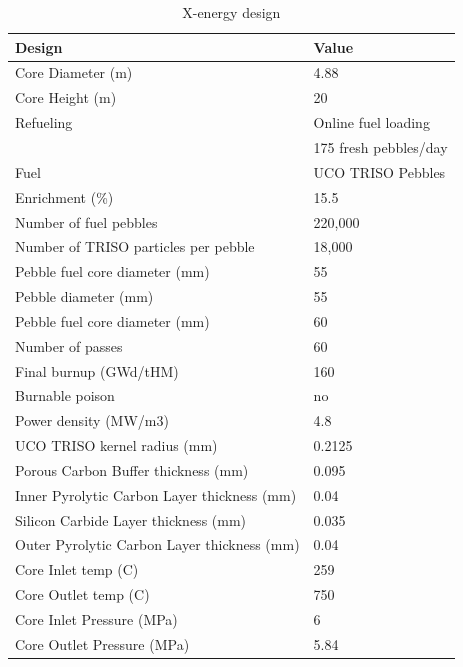 \documentclass[10pt,a4paper]{article}
\begin{document}
\begin{table} [ht]
\begin{center}

\caption{ X-energy design}
\label{xtable}
\begin{tabular}{l l}
\hline 
Design 		&Value \\ 
\hline 
Core Diameter (m) 		&4.88 \\ 
Core Height (m) 		&20 \\ 
Refueling		&Online fuel loading  \\ 
	&175 fresh pebbles/day \\ 
Fuel		&UCO TRISO Pebbles \\ 
Enrichment (\%)		&15.5 \\ 
Number of fuel pebbles		&220,000 \\ 
Number of TRISO particles per pebble		&18,000 \\ 
Pebble fuel core diameter (mm)		&55 \\ 
Pebble diameter (mm)	&55 \\ 
Pebble fuel core diameter (mm)		&60 \\ 
Number of passes		&60\\ 
Final burnup (GWd/tHM)		&160 \\ 
Burnable poison		&no \\ 
Power density (MW/m3)		&4.8 \\ 
UCO TRISO kernel radius (mm)	&0.2125 \\ 
Porous Carbon Buffer thickness (mm)	&0.095 \\ 
Inner Pyrolytic Carbon Layer thickness (mm) 	&0.04 \\ 
Silicon Carbide Layer thickness (mm)	&0.035 \\ 
Outer Pyrolytic Carbon Layer thickness (mm)	&0.04 \\ 
Core Inlet temp (C)	&259 \\ 
Core Outlet temp (C) 	&750 \\ 
Core Inlet Pressure (MPa)	&6 \\ 
Core Outlet Pressure (MPa)	&5.84 \\ 
\hline 

\end{tabular}
\end{center}
\end{table}
\end{document}

